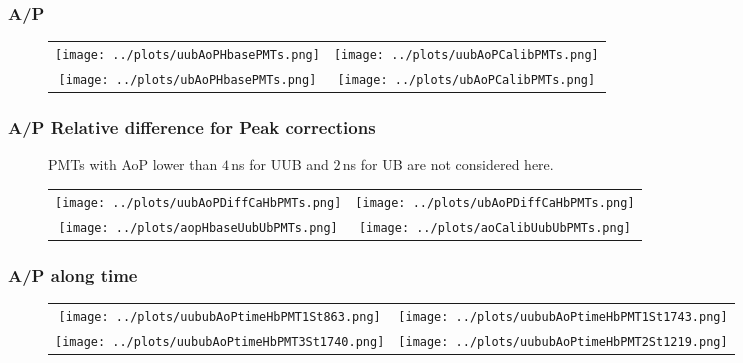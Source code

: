 \documentclass[aspectratio=169]{beamer}
\begin{document}
\begin{frame}
  \frametitle{A/P}
  \begin{figure}
    \centering
    \begin{tabularx}{\textwidth}{CC}
      \texttt{[image: ../plots/uubAoPHbasePMTs.png]}
      &
      \texttt{[image: ../plots/uubAoPCalibPMTs.png]}
      \\
      \texttt{[image: ../plots/ubAoPHbasePMTs.png]}
      &
      \texttt{[image: ../plots/ubAoPCalibPMTs.png]}
    \end{tabularx}
  \end{figure}
  \centering
  
\end{frame}


\begin{frame}
  \frametitle{A/P Relative difference for Peak corrections}
  \begin{figure}
    PMTs with AoP lower than $4$\,ns for UUB and $2$\,ns for UB are not considered here.
    \centering
    \begin{tabularx}{\textwidth}{CC}
      \texttt{[image: ../plots/uubAoPDiffCaHbPMTs.png]}
      &
      \texttt{[image: ../plots/ubAoPDiffCaHbPMTs.png]}
      \\
      \texttt{[image: ../plots/aopHbaseUubUbPMTs.png]}
      &
      \texttt{[image: ../plots/aoCalibUubUbPMTs.png]}
    \end{tabularx}
  \end{figure}
\end{frame}


\begin{frame}
  \frametitle{A/P along time}
  \begin{figure}
    \centering
    \begin{tabularx}{\textwidth}{CC}
      \texttt{[image: ../plots/uububAoPtimeHbPMT1St863.png]}
      &
      \texttt{[image: ../plots/uububAoPtimeHbPMT1St1743.png]}
      \\
      \texttt{[image: ../plots/uububAoPtimeHbPMT3St1740.png]}
      &
      \texttt{[image: ../plots/uububAoPtimeHbPMT2St1219.png]}
    \end{tabularx}
  \end{figure}
\end{frame}


\end{document}
